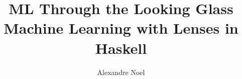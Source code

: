 \documentclass[12pt, a4paper, oneside]{report}
\begin{document}
\title{ML Through the Looking Glass\\ \vspace{0.5em} \large Machine Learning with Lenses in Haskell}
\author{Alexandre Noel}




\tableofcontents







% 




\appendix


\printbibliography
\end{document}
